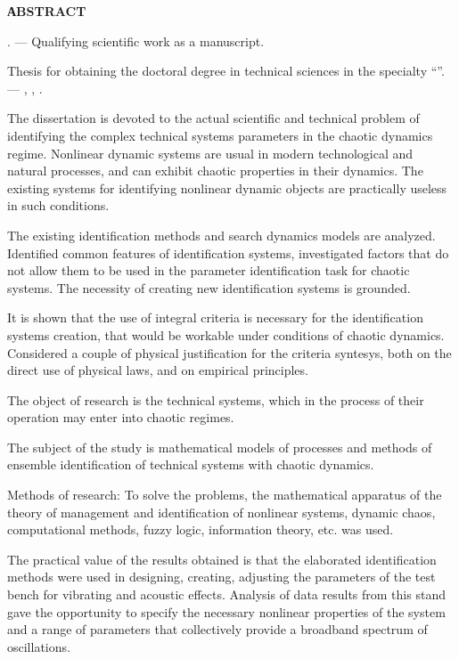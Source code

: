 
\clearpage

{}

\begin{center}
\textbf{АBSTRACT}
\end{center}

\medskip

\textit{\dissauthorEn} \booknameEn.
---
Qualifying scientific work as a manuscript.

Thesis for obtaining the doctoral degree in technical sciences in the specialty
\dissSpecId ``\dissSpecEn''. --- \institutionEn, \belongEn, \bookyear.

The dissertation is devoted to the actual scientific and technical problem of
identifying the complex technical systems parameters in the chaotic dynamics regime.
Nonlinear dynamic systems are usual in modern technological and natural processes,
and can exhibit chaotic properties in their dynamics.
The existing systems for identifying nonlinear dynamic objects are practically
useless in such conditions.

The existing identification methods and search dynamics models are analyzed.
Identified common features of identification systems, investigated factors that
do not allow them to be used in the parameter identification task for chaotic systems.
The necessity of creating new identification systems is grounded.

It is shown that the use of integral criteria is necessary
for the identification systems creation, that would be workable under conditions of chaotic
dynamics. Considered a couple of physical justification for the criteria syntesys,
both on the direct use of physical laws, and on empirical principles.

The object of research is the technical systems, which in the process of their operation may enter into chaotic regimes.

The subject of the study is mathematical models of processes and methods of
ensemble identification of technical systems with chaotic dynamics.

Methods of research: To solve the problems, the mathematical apparatus of the
theory of management and identification of nonlinear systems, dynamic chaos,
computational methods, fuzzy logic, information theory, etc. was used.

The practical value of the results obtained is that the elaborated
identification methods were used in designing, creating, adjusting the
parameters of the test bench for vibrating and acoustic effects. Analysis of
data results from this stand gave the opportunity to specify the necessary
nonlinear properties of the system and a range of parameters that collectively
provide a broadband spectrum of oscillations.

